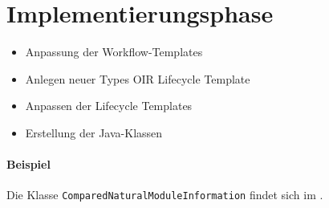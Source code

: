 \section{Implementierungsphase} 
\label{sec:Implementierungsphase}


\begin{itemize}
	\item Anpassung der Workflow-Templates
	\item Anlegen neuer Types
	\subitem OIR
	\subitem Lifecycle Template
	\item Anpassen der Lifecycle Templates
	\item Erstellung der Java-Klassen
\end{itemize}

\paragraph{Beispiel}
Die Klasse \texttt{Com\-par\-ed\-Na\-tu\-ral\-Mo\-dule\-In\-for\-ma\-tion} findet sich im .  
